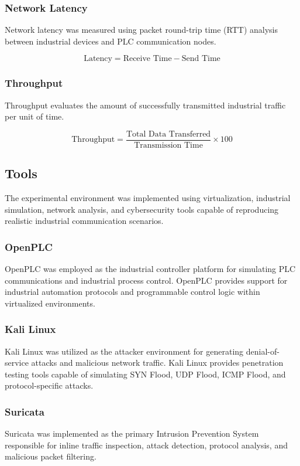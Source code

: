 \documentclass[sigconf]{acmart}
\begin{document}
\subsubsection{Network Latency}
Network latency was measured using packet round-trip time (RTT) analysis between industrial devices and PLC communication nodes.

\[
\text{Latency} = \text{Receive Time} - \text{Send Time}
\]

\subsubsection{Throughput}

Throughput evaluates the amount of successfully transmitted industrial traffic per unit of time.

\[
\text{Throughput} = \frac{\text{Total Data Transferred}}{\text{Transmission Time}} \times 100
\]

\subsection{Tools}
The experimental environment was implemented using virtualization, industrial simulation, network analysis, and cybersecurity tools capable of reproducing realistic industrial communication scenarios.

\subsubsection{OpenPLC}
OpenPLC was employed as the industrial controller platform for simulating PLC communications and industrial process control. OpenPLC provides support for industrial automation protocols and programmable control logic within virtualized environments.

\subsubsection{Kali Linux}
Kali Linux was utilized as the attacker environment for generating denial-of-service attacks and malicious network traffic. Kali Linux provides penetration testing tools capable of simulating SYN Flood, UDP Flood, ICMP Flood, and protocol-specific attacks.

\subsubsection{Suricata}
Suricata was implemented as the primary Intrusion Prevention System responsible for inline traffic inspection, attack detection, protocol analysis, and malicious packet filtering.
\end{document}
